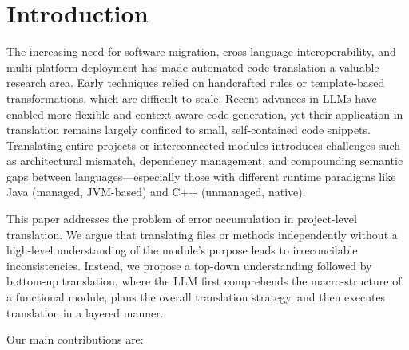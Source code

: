 
\section{Introduction}

The increasing need for software migration, cross-language interoperability, and multi-platform deployment has made automated code translation a valuable research area. Early techniques relied on handcrafted rules or template-based transformations, which are difficult to scale. Recent advances in LLMs have enabled more flexible and context-aware code generation, yet their application in translation remains largely confined to small, self-contained code snippets. Translating entire projects or interconnected modules introduces challenges such as architectural mismatch, dependency management, and compounding semantic gaps between languages—especially those with different runtime paradigms like Java (managed, JVM-based) and C++ (unmanaged, native).



This paper addresses the problem of error accumulation in project-level translation. We argue that translating files or methods independently without a high-level understanding of the module’s purpose leads to irreconcilable inconsistencies. Instead, we propose a top-down understanding followed by bottom-up translation, where the LLM first comprehends the macro-structure of a functional module, plans the overall translation strategy, and then executes translation in a layered manner.

Our main contributions are:

